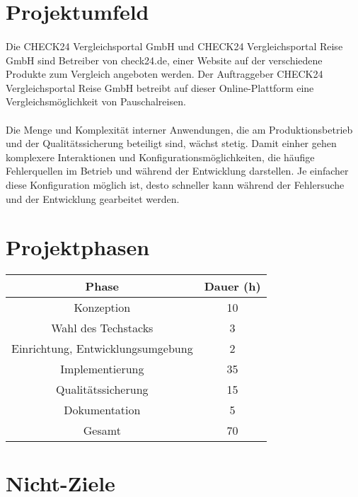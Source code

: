 \documentclass[a4paper,11pt]{article}
\begin{document}
\section{Projektumfeld}
\paragraph{}
Die CHECK24 Vergleichsportal GmbH und CHECK24 Vergleichsportal Reise GmbH sind
Betreiber von check24.de, einer Website auf der verschiedene Produkte zum Vergleich
angeboten werden. Der Auftraggeber CHECK24 Vergleichsportal Reise GmbH betreibt
auf dieser Online-Plattform eine Vergleichsmöglichkeit von Pauschalreisen.
\paragraph{}
Die Menge und Komplexität interner Anwendungen, die am Produktionsbetrieb
und der Qualitätssicherung beteiligt sind, wächst stetig. Damit einher gehen
komplexere Interaktionen und Konfigurationsmöglichkeiten, die häufige
Fehlerquellen im Betrieb und während der Entwicklung darstellen. Je einfacher
diese Konfiguration möglich ist, desto schneller kann während der Fehlersuche
und der Entwicklung gearbeitet werden.

\section{Projektphasen}


\begin{tabularx}{0.8\textwidth}{ c | c }
	\textbf{Phase}                    & \textbf{Dauer (h)} \\ \hline
	Konzeption                        & 10                 \\ \hline
	Wahl des Techstacks               & 3                  \\ \hline
	Einrichtung, Entwicklungsumgebung & 2                  \\ \hline
	Implementierung                   & 35                 \\ \hline
	Qualitätssicherung                & 15                 \\ \hline
	Dokumentation                     & 5                  \\ \hline
	Gesamt                            & 70
\end{tabularx}


\section{Nicht-Ziele}
\end{document}
